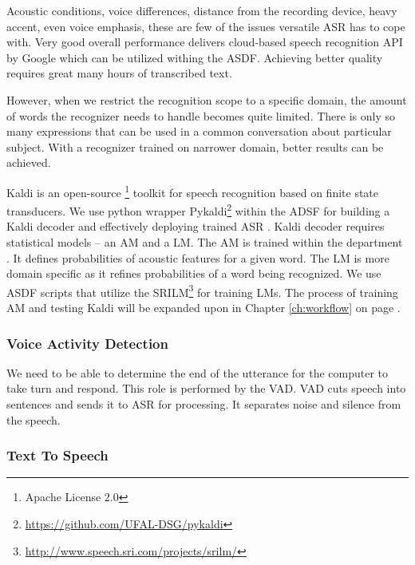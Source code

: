 Acoustic conditions, voice differences, distance from the recording device, heavy accent, even voice emphasis, these are few of the issues versatile \ac{ASR} has to cope with.
Very good overall performance delivers cloud-based speech recognition \acf{API} by Google which can be utilized withing the \ac{ASDF}.
Achieving better quality requires great many hours of transcribed text.

However, when we restrict the recognition scope to a specific domain, the amount of words the recognizer needs to handle becomes quite limited.
There is only so many expressions that can be used in a common conversation about particular subject.
With a recognizer trained on narrower domain, better results can be achieved.


Kaldi is an open-source \footnote{Apache License 2.0} toolkit for speech recognition based on finite state transducers.
We use python wrapper Pykaldi\footnote{\url{https://github.com/UFAL-DSG/pykaldi}} within the ADSF for building a Kaldi decoder and effectively deploying trained \ac{ASR} \cite{oplatek}.
Kaldi decoder requires statistical models -- an \acf{AM} and a \acf{LM}.
The \ac{AM} is trained within the department \cite{oplatek_thesis}.
It defines probabilities of acoustic features for a given word.
The \ac{LM} is more domain specific as it refines probabilities of a word being recognized.
We use \ac{ASDF} 
scripts that utilize the \acf{SRILM}\footnote{\url{http://www.speech.sri.com/projects/srilm/}} for training \acp{LM}.
The process of training \ac{AM} and testing Kaldi will be expanded upon in Chapter \ref{ch:workflow} on page \pageref{ch:workflow}.

\subsubsection{Voice Activity Detection}

We need to be able to determine the end of the utterance for the computer to take turn and respond.
This role is performed by the \acf{VAD}.
\ac{VAD} cuts speech into sentences and sends it to \ac{ASR} for processing.
It separates noise and silence from the speech.

\subsubsection{Text To Speech}

